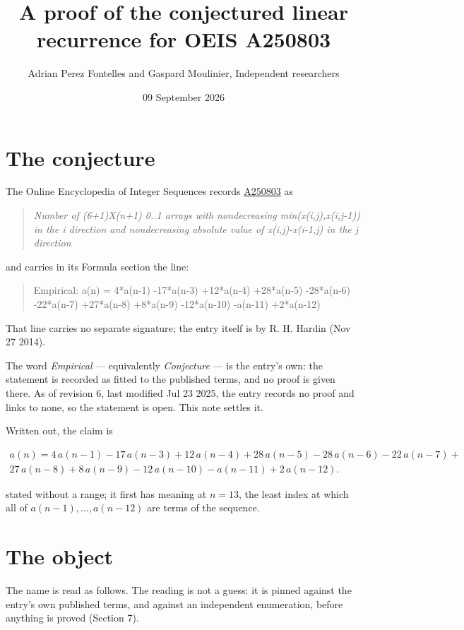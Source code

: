 \documentclass[11pt]{article}
\title{A proof of the conjectured linear recurrence for OEIS A250803}
\author{Adrian Perez Fontelles and Gaspard Moulinier, Independent researchers}
\date{09 September 2026}
\theoremstyle{definition}
\begin{document}
\maketitle
\section{The conjecture}

The Online Encyclopedia of Integer Sequences records \href{https://oeis.org/A250803}{A250803} as

\begin{quote}\itshape Number of (6+1)X(n+1) 0..1 arrays with nondecreasing min(x(i,j),x(i,j-1)) in the i direction and nondecreasing absolute value of x(i,j)-x(i-1,j) in the j direction\end{quote}

and carries in its Formula section the line:

\begin{quote}\ttfamily Empirical: a(n) = 4*a(n-1) -17*a(n-3) +12*a(n-4) +28*a(n-5) -28*a(n-6) -22*a(n-7) +27*a(n-8) +8*a(n-9) -12*a(n-10) -a(n-11) +2*a(n-12)\end{quote}

That line carries no separate signature; the entry itself is by R. H. Hardin (Nov 27 2014).

The word {\itshape Empirical} --- equivalently {\itshape Conjecture} --- is the entry's own: the statement is recorded as fitted to the published terms, and no proof is given there. As of revision 6, last modified Jul 23 2025, the entry records no proof and links to none, so the statement is open. This note settles it.

Written out, the claim is

\begin{multline*} a(n) = 4\,a(n-1) - 17\,a(n-3) + 12\,a(n-4) + 28\,a(n-5) - 28\,a(n-6) - 22\,a(n-7) + \\ 27\,a(n-8) + 8\,a(n-9) - 12\,a(n-10) - a(n-11) + 2\,a(n-12). \end{multline*}

stated without a range; it first has meaning at $n = 13$, the least index at which all of $a(n-1),\dots,a(n-12)$ are terms of the sequence.

\section{The object}

The name is read as follows. The reading is not a guess: it is pinned against the entry's own published terms, and against an independent enumeration, before anything is proved (Section 7).
\end{document}
